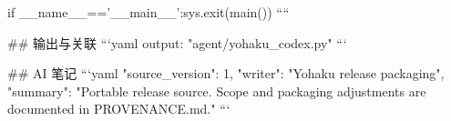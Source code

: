 if __name__=='__main__':sys.exit(main())
````

## 输出与关联
```yaml
output: "agent/yohaku_codex.py"
```

## AI 笔记
```yaml
{"source_version": 1, "writer": "Yohaku release packaging", "summary": "Portable release source. Scope and packaging adjustments are documented in PROVENANCE.md."}
```
